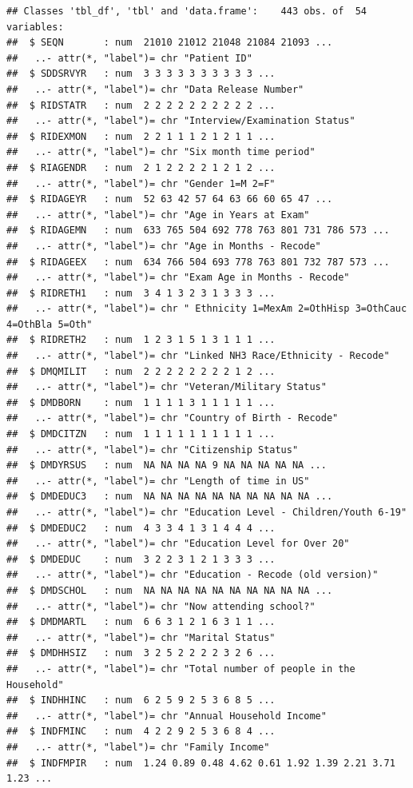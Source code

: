 \documentclass[
]{book}
\theoremstyle{definition}
\theoremstyle{definition}
\theoremstyle{definition}
\theoremstyle{remark}
\begin{document}
\begin{verbatim}
## Classes 'tbl_df', 'tbl' and 'data.frame':    443 obs. of  54 variables:
##  $ SEQN       : num  21010 21012 21048 21084 21093 ...
##   ..- attr(*, "label")= chr "Patient ID"
##  $ SDDSRVYR   : num  3 3 3 3 3 3 3 3 3 3 ...
##   ..- attr(*, "label")= chr "Data Release Number"
##  $ RIDSTATR   : num  2 2 2 2 2 2 2 2 2 2 ...
##   ..- attr(*, "label")= chr "Interview/Examination Status"
##  $ RIDEXMON   : num  2 2 1 1 1 2 1 2 1 1 ...
##   ..- attr(*, "label")= chr "Six month time period"
##  $ RIAGENDR   : num  2 1 2 2 2 2 1 2 1 2 ...
##   ..- attr(*, "label")= chr "Gender 1=M 2=F"
##  $ RIDAGEYR   : num  52 63 42 57 64 63 66 60 65 47 ...
##   ..- attr(*, "label")= chr "Age in Years at Exam"
##  $ RIDAGEMN   : num  633 765 504 692 778 763 801 731 786 573 ...
##   ..- attr(*, "label")= chr "Age in Months - Recode"
##  $ RIDAGEEX   : num  634 766 504 693 778 763 801 732 787 573 ...
##   ..- attr(*, "label")= chr "Exam Age in Months - Recode"
##  $ RIDRETH1   : num  3 4 1 3 2 3 1 3 3 3 ...
##   ..- attr(*, "label")= chr " Ethnicity 1=MexAm 2=OthHisp 3=OthCauc 4=OthBla 5=Oth"
##  $ RIDRETH2   : num  1 2 3 1 5 1 3 1 1 1 ...
##   ..- attr(*, "label")= chr "Linked NH3 Race/Ethnicity - Recode"
##  $ DMQMILIT   : num  2 2 2 2 2 2 2 2 1 2 ...
##   ..- attr(*, "label")= chr "Veteran/Military Status"
##  $ DMDBORN    : num  1 1 1 1 3 1 1 1 1 1 ...
##   ..- attr(*, "label")= chr "Country of Birth - Recode"
##  $ DMDCITZN   : num  1 1 1 1 1 1 1 1 1 1 ...
##   ..- attr(*, "label")= chr "Citizenship Status"
##  $ DMDYRSUS   : num  NA NA NA NA 9 NA NA NA NA NA ...
##   ..- attr(*, "label")= chr "Length of time in US"
##  $ DMDEDUC3   : num  NA NA NA NA NA NA NA NA NA NA ...
##   ..- attr(*, "label")= chr "Education Level - Children/Youth 6-19"
##  $ DMDEDUC2   : num  4 3 3 4 1 3 1 4 4 4 ...
##   ..- attr(*, "label")= chr "Education Level for Over 20"
##  $ DMDEDUC    : num  3 2 2 3 1 2 1 3 3 3 ...
##   ..- attr(*, "label")= chr "Education - Recode (old version)"
##  $ DMDSCHOL   : num  NA NA NA NA NA NA NA NA NA NA ...
##   ..- attr(*, "label")= chr "Now attending school?"
##  $ DMDMARTL   : num  6 6 3 1 2 1 6 3 1 1 ...
##   ..- attr(*, "label")= chr "Marital Status"
##  $ DMDHHSIZ   : num  3 2 5 2 2 2 2 3 2 6 ...
##   ..- attr(*, "label")= chr "Total number of people in the Household"
##  $ INDHHINC   : num  6 2 5 9 2 5 3 6 8 5 ...
##   ..- attr(*, "label")= chr "Annual Household Income"
##  $ INDFMINC   : num  4 2 2 9 2 5 3 6 8 4 ...
##   ..- attr(*, "label")= chr "Family Income"
##  $ INDFMPIR   : num  1.24 0.89 0.48 4.62 0.61 1.92 1.39 2.21 3.71 1.23 ...

\end{verbatim}
\end{document}
